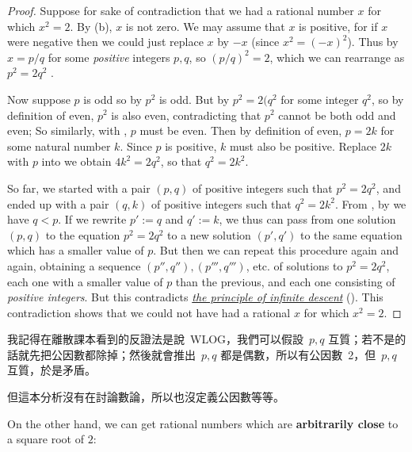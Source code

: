 \begin{proof}
Suppose for sake of contradiction that we had a rational number \(x\) for which \(x^2 = 2\).
By (b), \(x\) is not zero.
We may assume that \(x\) is positive, for if \(x\) were negative then we could just replace \(x\) by \(-x\) (since \(x^2 = (-x)^2\)).
Thus by  \(x = p/q\) for some \emph{positive} integers \(p, q\), so \((p/q)^2 = 2\), which we can rearrange as \(p^2 = 2q^2\) .

Now suppose \(p\) is odd so by  \(p^2\) is odd.
But by  \(p^2 = 2(q^2\) for some integer \(q^2\), so by definition of even, \(p^2\) is also even, contradicting  that \(p^2\) cannot be both odd and even; So similarly, with , \(p\) must be even.
Then by definition of even, \(p = 2k\) for some natural number \(k\).
Since \(p\) is positive, \(k\) must also be positive.
Replace \(2k\) with \(p\) into  we obtain \(4k^2 =2q^2\), so that \(q^2 = 2k^2\).

So far, we started with a pair \((p, q)\) of positive integers such that \(p^2 = 2q^2\), and ended up with a pair \((q, k)\) of positive integers such that \(q^2 =2k^2\).
From , by  we have \(q < p\).
If we rewrite \(p' := q\) and \(q' := k\), we thus can pass from one solution \((p, q)\) to the equation \(p^2 = 2q^2\) to a new solution \((p', q')\) to the same equation which has a smaller value of \(p\).
But then we can repeat this procedure again and again, obtaining a sequence \((p'', q''), (p''', q''')\), etc. of solutions to \(p^2 = 2q^2\), each one with a smaller value of \(p\) than the previous, and each one consisting of \emph{positive integers}.
But this contradicts \href{https://www.wikiwand.com/en/Proof_by_infinite_descent}{\emph{the principle of infinite descent}} ().
This contradiction shows that we could not have had a rational \(x\) for which \(x^2 = 2\).
\end{proof}

\begin{note}
我記得在離散課本看到的反證法是說\ WLOG，我們可以假設\ \(p, q\) 互質；若不是的話就先把公因數都除掉；然後就會推出\ \(p, q\) 都是偶數，所以有公因數\ 2，但\ \(p, q\) 互質，於是矛盾。

但這本分析沒有在討論數論，所以也沒定義公因數等等。
\end{note}

On the other hand, we can get rational numbers which are \textbf{arbitrarily close} to a square root of \(2\):

